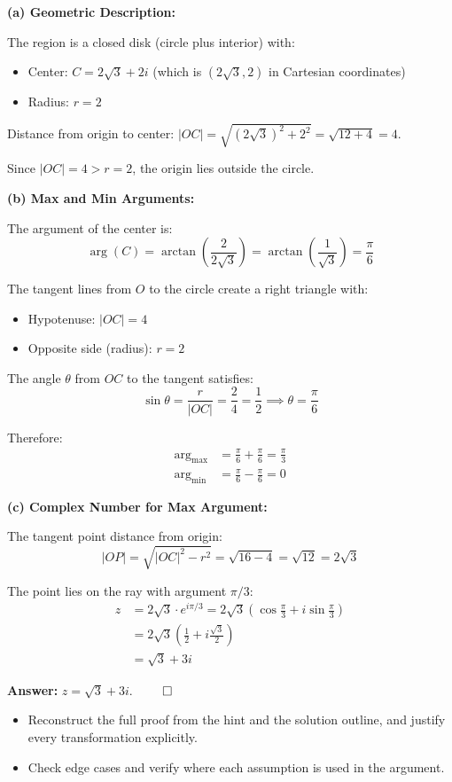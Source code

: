 \begin{solution}
\textbf{(a) Geometric Description:}

The region is a closed disk (circle plus interior) with:
\begin{itemize}
\item Center: $C = 2\sqrt{3} + 2i$ (which is $(2\sqrt{3}, 2)$ in Cartesian coordinates)
\item Radius: $r = 2$
\end{itemize}

Distance from origin to center: $|OC| = \sqrt{(2\sqrt{3})^2 + 2^2} = \sqrt{12 + 4} = 4$.

Since $|OC| = 4 > r = 2$, the origin lies outside the circle.

\vspace{0.3cm}

\textbf{(b) Max and Min Arguments:}

The argument of the center is:
\[
\arg(C) = \arctan\left(\frac{2}{2\sqrt{3}}\right) = \arctan\left(\frac{1}{\sqrt{3}}\right) = \frac{\pi}{6}
\]

The tangent lines from $O$ to the circle create a right triangle with:
\begin{itemize}
\item Hypotenuse: $|OC| = 4$
\item Opposite side (radius): $r = 2$
\end{itemize}

The angle $\theta$ from $OC$ to the tangent satisfies:
\[
\sin \theta = \frac{r}{|OC|} = \frac{2}{4} = \frac{1}{2} \implies \theta = \frac{\pi}{6}
\]

Therefore:
\begin{align*}
\arg_{\max} &= \frac{\pi}{6} + \frac{\pi}{6} = \frac{\pi}{3} \\
\arg_{\min} &= \frac{\pi}{6} - \frac{\pi}{6} = 0
\end{align*}

\vspace{0.3cm}

\textbf{(c) Complex Number for Max Argument:}

The tangent point distance from origin:
\[
|OP| = \sqrt{|OC|^2 - r^2} = \sqrt{16 - 4} = \sqrt{12} = 2\sqrt{3}
\]

The point lies on the ray with argument $\pi/3$:
\begin{align*}
z &= 2\sqrt{3} \cdot e^{i\pi/3} = 2\sqrt{3}\left(\cos\frac{\pi}{3} + i\sin\frac{\pi}{3}\right) \\
&= 2\sqrt{3}\left(\frac{1}{2} + i\frac{\sqrt{3}}{2}\right) \\
&= \sqrt{3} + 3i
\end{align*}

\textbf{Answer:} $z = \sqrt{3} + 3i$. $\qed$
\end{solution}

\begin{takeaways}
\begin{itemize}[leftmargin=*]
\item Reconstruct the full proof from the hint and the solution outline, and justify every transformation explicitly.
\item Check edge cases and verify where each assumption is used in the argument.
\end{itemize}
\end{takeaways}
